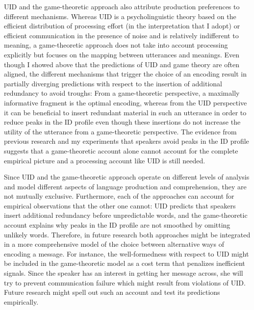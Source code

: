 UID and the game-theoretic approach also attribute production preferences to different mechanisms. Whereas UID is a psycholinguistic theory based on the efficient distribution of processing effort (in the interpretation that I adopt) or efficient communication in the presence of noise and is relatively indifferent to meaning, a game-theoretic approach does not take into account processing explicitly but focuses on the mapping between utterances and meanings. Even though I showed above that the predictions of UID and game theory are often aligned, the different mechanisms that trigger the choice of an encoding result in partially diverging predictions with respect to the insertion of additional redundancy to avoid troughs: From a game-theoretic perspective, a maximally informative fragment is the optimal encoding, whereas from the UID perspective it can be beneficial to insert redundant material in such an utterance in order to reduce peaks in the ID profile even though these insertions do not increase the utility of the utterance from a game-theoretic perspective. The evidence from previous research and my experiments that speakers avoid peaks in the ID profile suggests that a game-theoretic account alone cannot account for the complete empirical picture and a processing account like UID is still needed.

Since UID and the game-theoretic approach operate on different levels of analysis and model different aspects of language production and comprehension, they are not mutually exclusive. Furthermore, each of the approaches can account for empirical observations that the other one cannot: UID predicts that speakers insert additional redundancy before unpredictable words, and the game-theoretic account explains why peaks in the ID profile are not smoothed by omitting unlikely words. Therefore, in future research both approaches might be integrated in a more comprehensive model of the choice between alternative ways of encoding a message. For instance, the well-formedness with respect to UID might be included in the game-theoretic model as a cost term that penalizes inefficient signals. Since the speaker has an interest in getting her message across, she will try to prevent communication failure which might result from violations of UID. Future research might spell out such an account and test its predictions empirically.